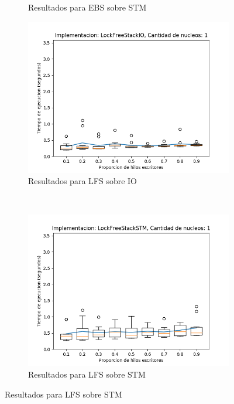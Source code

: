 \begin{appendices}
\begin{figure}[H]
\begin{subfigure}[b]{0.49\textwidth}
        \caption{Resultados para EBS sobre STM}
        \label{subfig:pushPercentages-ebsstm-1}
    \end{subfigure}
    \begin{subfigure}[b]{0.49\textwidth}
        \includegraphics[width=\textwidth]{images/pushPercentages/plots/expLFSIO-1}
        \caption{Resultados para LFS sobre IO}
        \label{subfig:pushPercentages-lfsio-1}
    \end{subfigure}
    ~
    \begin{subfigure}[b]{0.49\textwidth}
        \includegraphics[width=\textwidth]{images/pushPercentages/plots/expLFSSTM-1}
        \caption{Resultados para LFS sobre STM}
        \label{subfig:pushPercentages-lfsstm-1}

\end{subfigure}
\end{figure}
\end{appendices}
